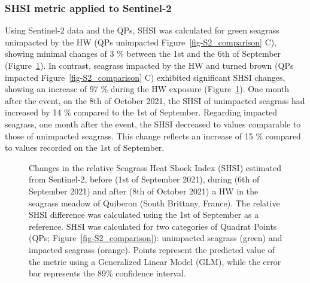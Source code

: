\documentclass[
  letterpaper,
  11pt,
  english,
  singlespacing,
  headsepline]{MastersDoctoralThesis}
\begin{document}
\begin{spacing}{1.5}
\begin{figure}
\end{figure}%

\subsubsection{SHSI metric applied to
Sentinel-2}\label{shsi-metric-applied-to-sentinel-2}

Using Sentinel-2 data and the QPs, SHSI was calculated for green
seagrass unimpacted by the HW (QPs unimpacted
Figure~\ref{fig-S2_comparison} C), showing minimal changes of 3 \%
between the 1st and the 6th of September
(Figure~\ref{fig-NDVI_GLI_SPC}). In contrast, seagrass impacted by the
HW and turned brown (QPs impacted Figure~\ref{fig-S2_comparison} C)
exhibited significant SHSI changes, showing an increase of 97 \% during
the HW exposure (Figure~\ref{fig-NDVI_GLI_SPC}). One month after the
event, on the 8th of October 2021, the SHSI of unimpacted seagrass had
increased by 14 \% compared to the 1st of September. Regarding impacted
seagrass, one month after the event, the SHSI decreased to values
comparable to those of unimpacted seagrass. This change reflects an
increase of 15 \% compared to values recorded on the 1st of September.

\begin{figure}


\caption{\label{fig-NDVI_GLI_SPC}Changes in the relative Seagrass Heat
Shock Index (SHSI) estimated from Sentinel-2, before (1st of September
2021), during (6th of September 2021) and after (8th of October 2021) a
HW in the seagrass meadow of Quiberon (South Brittany, France). The
relative SHSI difference was calculated using the 1st of September as a
reference. SHSI was calculated for two categories of Quadrat Points
(QPs; Figure~\ref{fig-S2_comparison}): unimpacted seagrass (green) and
impacted seagrass (orange). Points represent the predicted value of the
metric using a Generalized Linear Model (GLM), while the error bar
represents the 89\% confidence interval.}


\end{figure}
\end{spacing}
\end{document}
